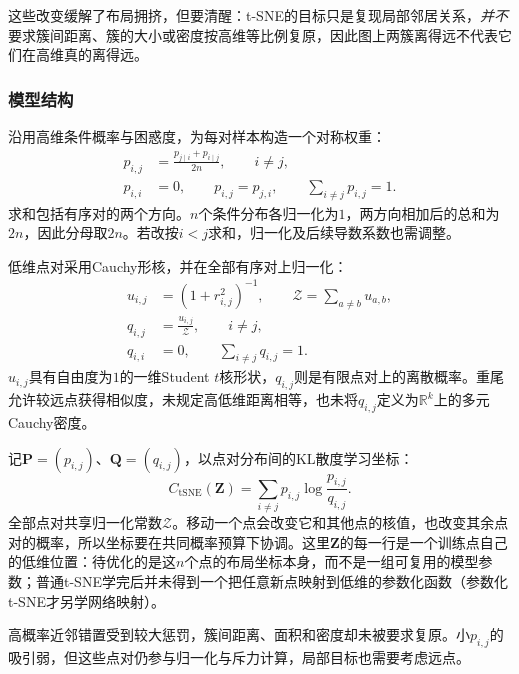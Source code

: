 这些改变缓解了布局拥挤，但要清醒：t-SNE的目标只是复现局部邻居关系，\emph{并不}要求簇间距离、簇的大小或密度按高维等比例复原，因此图上两簇离得远不代表它们在高维真的离得远。

\subsubsection{模型结构}

沿用高维条件概率与困惑度，为每对样本构造一个对称权重：
\begin{equation}
  \label{eq:dim-tsne-joint}
  \begin{aligned}
    p_{i,j}&=\frac{p_{j\mid i}+p_{i\mid j}}{2n},\qquad i\ne j,\\
    p_{i,i}&=0,\qquad p_{i,j}=p_{j,i},\qquad
      \sum_{i\ne j}p_{i,j}=1.
  \end{aligned}
\end{equation}
求和包括有序对的两个方向。$n$个条件分布各归一化为$1$，两方向相加后的总和为$2n$，因此分母取$2n$。若改按$i<j$求和，归一化及后续导数系数也需调整。

低维点对采用Cauchy形核，并在全部有序对上归一化：
\begin{equation}
  \label{eq:dim-tsne-low}
  \begin{aligned}
    u_{i,j}&=(1+r_{i,j}^2)^{-1},\qquad
      \mathcal{Z}=\sum_{a\ne b}u_{a,b},\\
    q_{i,j}&=\frac{u_{i,j}}{\mathcal{Z}},\qquad i\ne j,\\
    q_{i,i}&=0,\qquad \sum_{i\ne j}q_{i,j}=1.
  \end{aligned}
\end{equation}
$u_{i,j}$具有自由度为$1$的一维Student $t$核形状，$q_{i,j}$则是有限点对上的离散概率。重尾允许较远点获得相似度，未规定高低维距离相等，也未将$q_{i,j}$定义为$\mathbb{R}^k$上的多元Cauchy密度。

记$\bm{P}=(p_{i,j})$、$\bm{Q}=(q_{i,j})$，以点对分布间的KL散度学习坐标：
\begin{equation}
  \label{eq:dim-tsne-loss}
  C_{\mathrm{tSNE}}(\bm{Z})
    =\sum_{i\ne j}p_{i,j}\log\frac{p_{i,j}}{q_{i,j}}.
\end{equation}
全部点对共享归一化常数$\mathcal{Z}$。移动一个点会改变它和其他点的核值，也改变其余点对的概率，所以坐标要在共同概率预算下协调。这里$\bm{Z}$的每一行是一个训练点自己的低维位置：待优化的是这$n$个点的布局坐标本身，而不是一组可复用的模型参数；普通t-SNE学完后并未得到一个把任意新点映射到低维的参数化函数（参数化t-SNE才另学网络映射）。

高概率近邻错置受到较大惩罚，簇间距离、面积和密度却未被要求复原。小$p_{i,j}$的吸引弱，但这些点对仍参与归一化与斥力计算，局部目标也需要考虑远点。

